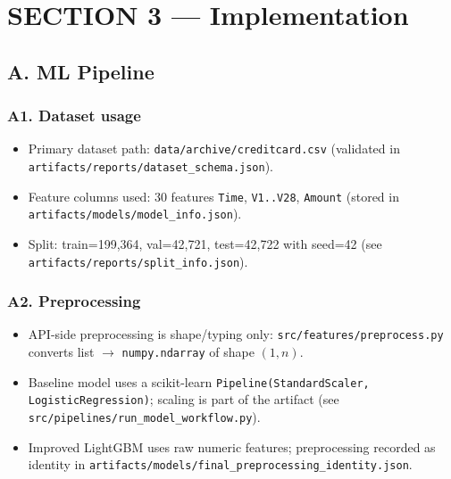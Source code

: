 \documentclass[11pt]{article}
\newcommand{\code}[1]{\texttt{#1}}
\begin{document}
\section*{SECTION 3 — Implementation}

\subsection*{A. ML Pipeline}

\subsubsection*{A1. Dataset usage}
\begin{itemize}
  \item Primary dataset path: \code{data/archive/creditcard.csv} (validated in \code{artifacts/reports/dataset\_schema.json}).
  \item Feature columns used: 30 features \code{Time}, \code{V1..V28}, \code{Amount} (stored in \code{artifacts/models/model\_info.json}).
  \item Split: train=199{,}364, val=42{,}721, test=42{,}722 with seed=42 (see \code{artifacts/reports/split\_info.json}).
\end{itemize}

\subsubsection*{A2. Preprocessing}
\begin{itemize}
  \item API-side preprocessing is shape/typing only: \code{src/features/preprocess.py} converts list \(\rightarrow\) \code{numpy.ndarray} of shape \((1,n)\).
  \item Baseline model uses a scikit-learn \code{Pipeline(StandardScaler, LogisticRegression)}; scaling is part of the artifact (see \code{src/pipelines/run\_model\_workflow.py}).
  \item Improved LightGBM uses raw numeric features; preprocessing recorded as identity in \code{artifacts/models/final\_preprocessing\_identity.json}.
\end{itemize}
\end{document}
